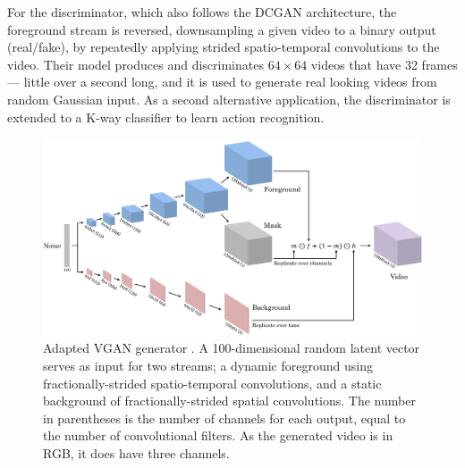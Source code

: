 For the discriminator, which also follows the DCGAN architecture, the foreground stream is reversed, downsampling a given video to a binary output (real/fake), by repeatedly applying strided spatio-temporal convolutions to the video. Their model produces and discriminates $64 \times 64$ videos that have 32 frames --- little over a second long, and it is used to generate real looking videos from random Gaussian input. As a second alternative application, the discriminator is extended to a K-way classifier to learn action recognition.\\

\begin{figure}
	\centering
	\includegraphics[width=1\textwidth]{graphics/gan/vgan/vgan/vgan_g.pdf}
  \caption[Adapted two-stream video generator network.]{Adapted VGAN generator \cite{vondrick2016generating}. A 100-dimensional random latent vector serves as input for two streams; a dynamic foreground using fractionally-strided spatio-temporal convolutions, and a static background of fractionally-strided spatial convolutions. The number in parentheses is the number of channels for each output, equal to the number of convolutional filters. As the generated video is in RGB, it does have three channels.}
  \label{fig:vgan_g}
\end{figure}


